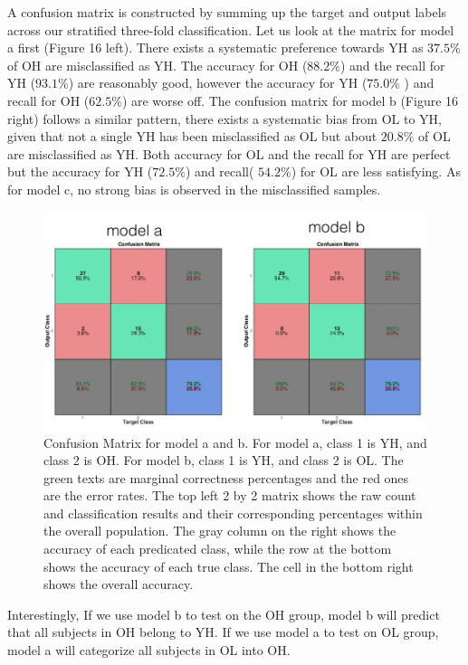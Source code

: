 \documentclass[a4paper,11pt,oneside]{article}
\begin{document}
A confusion matrix is constructed by summing up the target and output labels across our stratified three-fold classification. Let us look at the matrix for model a first (Figure 16 left). There exists a systematic preference towards YH as $37.5\%$ of OH are misclassified as YH. The accuracy for OH ($88.2\%$) and the recall for YH ($93.1\%$) are reasonably good, however the accuracy for YH ($75.0\%$ ) and recall for OH ($62.5\%$) are worse off.
The confusion matrix for model b (Figure 16 right) follows a similar pattern, there exists a systematic bias from OL to YH, given that not a single YH has been misclassified as OL but about $20.8\%$ of OL are misclassified as YH. Both accuracy for OL and the recall for YH are perfect but the accuracy for YH ($72.5\%$) and recall( $54.2\%$) for OL are less satisfying. As for model c, no strong bias is observed in the misclassified samples.
\begin{figure}[h!]
	\centering
	\includegraphics[width=\textwidth]{img/confusion}
	\caption{Confusion Matrix for model a and b. For model a, class 1 is YH, and class 2 is OH. For model b, class 1 is YH, and class 2 is OL. The green texts are marginal correctness percentages and the red ones are the error rates. The top left 2 by 2 matrix shows the raw count and classification results and their corresponding percentages within the overall population. The gray column on the right shows the accuracy of each predicated class, while the row at the bottom shows the accuracy of each true class. The cell in the bottom right shows the overall accuracy. }
\end{figure}


Interestingly, If we use model b to test on the OH group, model b will predict that all subjects in OH belong to YH. If we use model a to test on OL group, model a will categorize all subjects in OL into OH.
\end{document}
